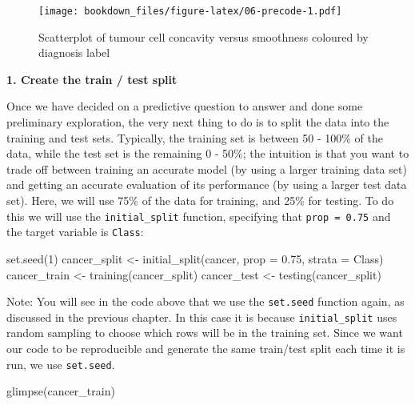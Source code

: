 \documentclass[
]{krantz}
\makeatletter
\newenvironment{Shaded}{\begin{snugshade}}{\end{snugshade}}
\newcommand{\AttributeTok}[1]{\textcolor[rgb]{0.61,0.61,0.61}{#1}}
\newcommand{\DecValTok}[1]{\textcolor[rgb]{0.06,0.06,0.06}{#1}}
\newcommand{\FloatTok}[1]{\textcolor[rgb]{0.06,0.06,0.06}{#1}}
\newcommand{\FunctionTok}[1]{\textcolor[rgb]{0,0,0}{#1}}
\newcommand{\NormalTok}[1]{#1}
\newcommand{\OtherTok}[1]{\textcolor[rgb]{0.37,0.37,0.37}{#1}}
\renewenvironment{quote}{\begin{VF}}{\end{VF}}
\newenvironment{kframe}{%
\medskip{}
\setlength{\fboxsep}{.8em}
 \def\at@end@of@kframe{}%
 \ifinner\ifhmode%
  \def\at@end@of@kframe{\end{minipage}}%
  \begin{minipage}{\columnwidth}%
 \fi\fi%
 \def\FrameCommand##1{\hskip\@totalleftmargin \hskip-\fboxsep
 \colorbox{shadecolor}{##1}\hskip-\fboxsep
     \hskip-\linewidth \hskip-\@totalleftmargin \hskip\columnwidth}%
 \MakeFramed {\advance\hsize-\width
   \@totalleftmargin\z@ \linewidth\hsize
   \@setminipage}}%
 {\par\unskip\endMakeFramed%
 \at@end@of@kframe}
\renewenvironment{Shaded}{\begin{kframe}}{\end{kframe}}
\makeatother
\begin{document}
\begin{figure}
\centering
\texttt{[image: bookdown\_files/figure-latex/06-precode-1.pdf]}
\caption{\label{fig:06-precode}Scatterplot of tumour cell concavity versus smoothness coloured by diagnosis label}
\end{figure}

\textbf{1. Create the train / test split}

Once we have decided on a predictive question to answer and done some
preliminary exploration, the very next thing to do is to split the data into
the training and test sets. Typically, the training set is between 50 - 100\% of
the data, while the test set is the remaining 0 - 50\%; the intuition is that
you want to trade off between training an accurate model (by using a larger
training data set) and getting an accurate evaluation of its performance (by
using a larger test data set). Here, we will use 75\% of the data for training,
and 25\% for testing. To do this we will use the \texttt{initial\_split} function,
specifying that \texttt{prop\ =\ 0.75} and the target variable is \texttt{Class}:

\begin{Shaded}
\begin{Highlighting}[]
\FunctionTok{set.seed}\NormalTok{(}\DecValTok{1}\NormalTok{)}
\NormalTok{cancer\_split }\OtherTok{\textless{}{-}} \FunctionTok{initial\_split}\NormalTok{(cancer, }\AttributeTok{prop =} \FloatTok{0.75}\NormalTok{, }\AttributeTok{strata =}\NormalTok{ Class)}
\NormalTok{cancer\_train }\OtherTok{\textless{}{-}} \FunctionTok{training}\NormalTok{(cancer\_split)}
\NormalTok{cancer\_test }\OtherTok{\textless{}{-}} \FunctionTok{testing}\NormalTok{(cancer\_split)}
\end{Highlighting}
\end{Shaded}

\begin{quote}
Note: You will see in the code above that we use the \texttt{set.seed} function again, as discussed in the previous chapter. In this case it is because
\texttt{initial\_split} uses random sampling to choose which rows will be in the training set. Since we want our code to be reproducible
and generate the same train/test split each time it is run, we use \texttt{set.seed}.
\end{quote}

\begin{Shaded}
\begin{Highlighting}[]
\FunctionTok{glimpse}\NormalTok{(cancer\_train)}
\end{Highlighting}
\end{Shaded}
\end{document}
